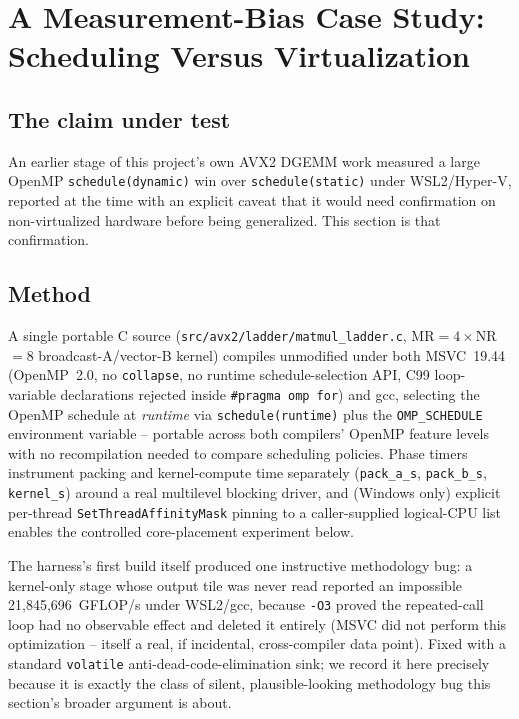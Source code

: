 \documentclass[acmsmall]{acmart}
\begin{document}
\section{A Measurement-Bias Case Study: Scheduling Versus Virtualization}
\label{sec:vmcase}

\subsection{The claim under test}
An earlier stage of this project's own AVX2 DGEMM work measured a large
OpenMP \texttt{schedule(dynamic)} win over \texttt{schedule(static)}
under WSL2/Hyper-V, reported at the time with an explicit caveat that it
would need confirmation on non-virtualized hardware before being
generalized. This section is that confirmation.

\subsection{Method}
A single portable C source (\texttt{src/avx2/ladder/matmul\_ladder.c},
MR${=}4{\times}$NR${=}8$ broadcast-A/vector-B kernel) compiles unmodified
under both MSVC~19.44 (OpenMP~2.0, no \texttt{collapse}, no runtime
schedule-selection API, C99 loop-variable declarations rejected inside
\texttt{\#pragma omp for}) and gcc, selecting the OpenMP schedule at
\emph{runtime} via \texttt{schedule(runtime)} plus the
\texttt{OMP\_SCHEDULE} environment variable -- portable across both
compilers' OpenMP feature levels with no recompilation needed to compare
scheduling policies. Phase timers instrument packing and kernel-compute
time separately (\texttt{pack\_a\_s}, \texttt{pack\_b\_s},
\texttt{kernel\_s}) around a real multilevel blocking driver, and
(Windows only) explicit per-thread \texttt{SetThreadAffinityMask}
pinning to a caller-supplied logical-CPU list enables the controlled
core-placement experiment below.

The harness's first build itself produced one instructive methodology
bug: a kernel-only stage whose output tile was never read reported an
impossible 21{,}845{,}696~GFLOP/s under WSL2/gcc, because \texttt{-O3}
proved the repeated-call loop had no observable effect and deleted it
entirely (MSVC did not perform this optimization -- itself a real,
if incidental, cross-compiler data point). Fixed with a standard
\texttt{volatile} anti-dead-code-elimination sink; we record it here
precisely because it is exactly the class of silent, plausible-looking
methodology bug this section's broader argument is about.
\end{document}
